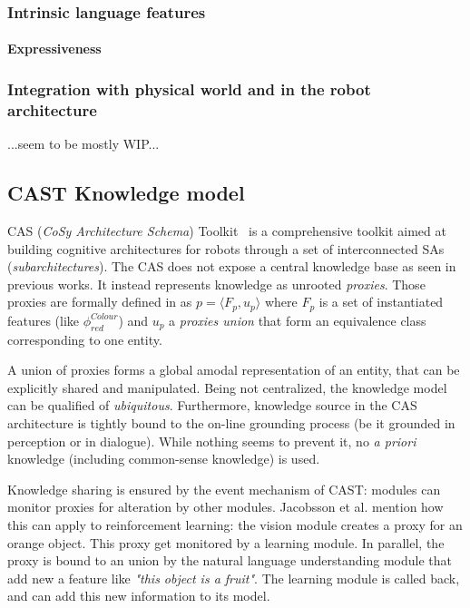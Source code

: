 \subsubsection{Intrinsic language features}
\label{sect|nkrl-intrinsic-features}

\paragraph{Expressiveness}

\subsubsection{Integration with physical world and in the robot architecture}
\label{sect|nkrl-integration}

...seem to be mostly WIP...


\subsection{CAST Knowledge model}
\label{sect|cast}

CAS (\emph{CoSy Architecture Schema}) Toolkit~\cite{Hawes2007} is a
comprehensive toolkit aimed at building cognitive architectures for robots
through a set of interconnected SAs (\emph{subarchitectures}). The CAS does not
expose a central knowledge base as seen in previous works. It instead
represents knowledge as unrooted \emph{proxies}. Those proxies are formally
defined in \cite{Jacobsson2008} as $p= \langle F_p, u_p \rangle$ where $F_p$ is
a set of instantiated features (like $\phi^{Colour}_{red}$) and $u_p$ a
\emph{proxies union} that form an equivalence class corresponding to one
entity.

A union of proxies forms a global amodal representation of an entity, that can
be explicitly shared and manipulated. Being not centralized, the knowledge
model can be qualified of \emph{ubiquitous}. Furthermore, knowledge source in
the CAS architecture is tightly bound to the on-line grounding process (be it
grounded in perception or in dialogue). While nothing seems to prevent it, no
{\it a priori} knowledge (including common-sense knowledge) is used.

Knowledge sharing is ensured by the event mechanism of CAST: modules can
monitor proxies for alteration by other modules. Jacobsson et al. mention how
this can apply to reinforcement learning: the vision module creates a proxy for
an orange object. This proxy get monitored by a learning module. In parallel,
the proxy is bound to an union by the natural language understanding module
that add new a feature like \emph{"this object is a fruit"}. The learning
module is called back, and can add this new information to its model.

